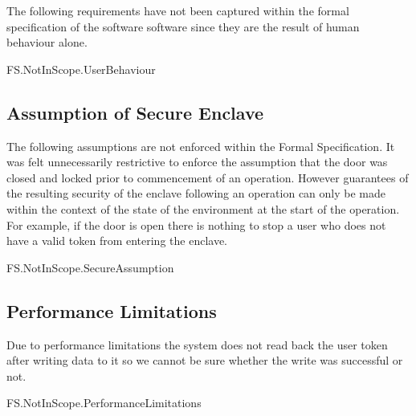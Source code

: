 The following requirements have not been captured within the formal
specification of the software software since
they are the result of human behaviour alone.

\begin{traceunit}{FS.NotInScope.UserBehaviour}
\end{traceunit}%

\subsection{Assumption of Secure Enclave}

The following assumptions are not enforced within the Formal
Specification. It was felt unnecessarily restrictive to enforce the
assumption that the door was closed and locked prior to commencement
of an operation. 
However guarantees of the resulting security of the enclave
following an operation can only be made within the context of the
state of the environment at the start of the operation. For example,
if the door is open there is nothing to stop a user who does not have
a valid token from entering the enclave.

\begin{traceunit}{FS.NotInScope.SecureAssumption}
\end{traceunit}%

\subsection{Performance Limitations}

Due to performance limitations the system does not read back the user
token after writing data to it so we cannot be sure whether the write
was successful or not.

\begin{traceunit}{FS.NotInScope.PerformanceLimitations}
\end{traceunit}%


